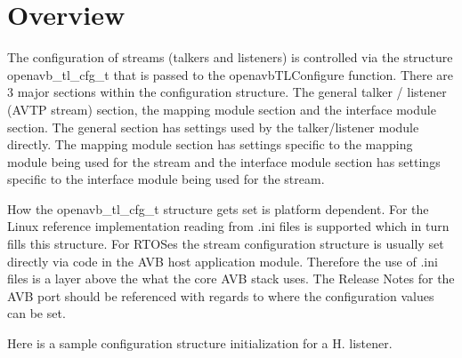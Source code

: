 \hypertarget{sdk_avtp_stream_cfg_sdk_avtp_stream_cfg_overview}{}\section{Overview }\label{sdk_avtp_stream_cfg_sdk_avtp_stream_cfg_overview}
The configuration of streams (talkers and listeners) is controlled via the structure openavb\+\_\+tl\+\_\+cfg\+\_\+t that is passed to the openavb\+T\+L\+Configure function. There are 3 major sections within the configuration structure. The general talker / listener (A\+V\+TP stream) section, the mapping module section and the interface module section. The general section has settings used by the talker/listener module directly. The mapping module section has settings specific to the mapping module being used for the stream and the interface module section has settings specific to the interface module being used for the stream.

How the openavb\+\_\+tl\+\_\+cfg\+\_\+t structure gets set is platform dependent. For the Linux reference implementation reading from .ini files is supported which in turn fills this structure. For R\+T\+O\+Ses the stream configuration structure is usually set directly via code in the A\+VB host application module. Therefore the use of .ini files is a layer above the what the core A\+VB stack uses. The Release Notes for the A\+VB port should be referenced with regards to where the configuration values can be set.

Here is a sample configuration structure initialization for a H. listener.


